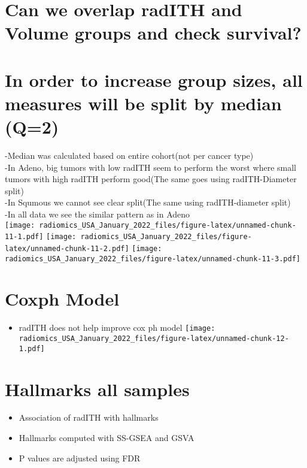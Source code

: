 \documentclass[]{article}
\providecommand{\tightlist}{%
  \setlength{\itemsep}{0pt}\setlength{\parskip}{0pt}}
\begin{document}
\section{Can we overlap radITH and Volume groups and check
survival?}\label{can-we-overlap-radith-and-volume-groups-and-check-survival}

\section{In order to increase group sizes, all measures will be split by
median
(Q=2)}\label{in-order-to-increase-group-sizes-all-measures-will-be-split-by-median-q2}

-Median was calculated based on entire cohort(not per cancer type)\\
-In Adeno, big tumors with low radITH seem to perform the worst where
small tumors with high radITH perform good(The same goes using
radITH-Diameter split)\\
-In Squmous we cannot see clear split(The same using radITH-diameter
split)\\
-In all data we see the similar pattern as in Adeno\\

\texttt{[image: radiomics\_USA\_January\_2022\_files/figure-latex/unnamed-chunk-11-1.pdf]}
\texttt{[image: radiomics\_USA\_January\_2022\_files/figure-latex/unnamed-chunk-11-2.pdf]}
\texttt{[image: radiomics\_USA\_January\_2022\_files/figure-latex/unnamed-chunk-11-3.pdf]}

\section{Coxph Model}\label{coxph-model}

\begin{itemize}
\tightlist
\item
  radITH does not help improve cox ph model
  \texttt{[image: radiomics\_USA\_January\_2022\_files/figure-latex/unnamed-chunk-12-1.pdf]}
\end{itemize}

\section{Hallmarks all samples}\label{hallmarks-all-samples}

\begin{itemize}
\tightlist
\item
  Association of radITH with hallmarks\\
\item
  Hallmarks computed with SS-GSEA and GSVA
\item
  P values are adjusted using FDR\\
\end{itemize}
\end{document}

